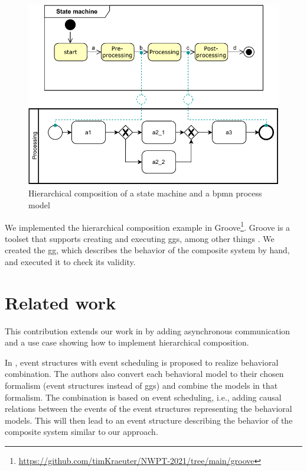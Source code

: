 \documentclass[a4paper]{easychair}
\begin{document}
\begin{figure}[h]
    \centering
    \includegraphics[width=.5\textwidth]{images/usecase.pdf}
    \caption{Hierarchical composition of a state machine and a \gls*{bpmn} process model}
    \label{fig:useCase}
\end{figure}
We implemented the hierarchical composition example in Groove\footnote{\url{https://github.com/timKraeuter/NWPT-2021/tree/main/groove}}. %
Groove is a toolset that supports creating and executing \glspl*{gg}, among other things \cite{ghamarianModellingAnalysisUsing2012, rensinkGROOVESimulatorTool2004}.
We created the \gls*{gg}, which describes the behavior of the composite system by hand, and executed it to check its validity.

\section{Related work}
This contribution extends our work in \cite{krauterBehavioralConsistencyHeterogeneous2021} by adding asynchronous communication and a use case showing how to implement hierarchical composition.

In \cite{kienzleUnifyingFrameworkHomogeneous2019}, event structures with event scheduling is proposed to realize behavioral combination.
The authors also convert each behavioral model to their chosen formalism (event structures instead of \glspl*{gg}) and combine the models in that formalism.
The combination is based on event scheduling, i.e., adding causal relations between the events of the event structures representing the behavioral models.
This will then lead to an event structure describing the behavior of the composite system similar to our approach.


\end{document}
